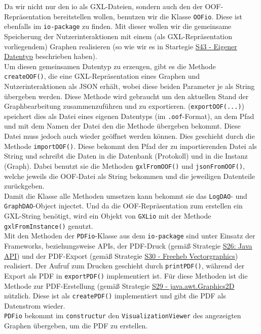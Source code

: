 \documentclass[enabledeprecatedfontcommands,fontsize=11pt,paper=a4,twoside]{scrartcl}
\newcounter{one}
\begin{document}
Da wir nicht nur den io als GXL-Dateien, sondern auch den der OOF-Repräsentation bereitstellen wollen, benutzen wir die Klasse \texttt{OOFio}.
Diese ist ebenfalls im \texttt{io-package} zu finden. Mit dieser wollen wir die gemeinsame Speicherung der Nutzerinteraktionen mit einem (als GXL-Repräsentation vorliegendem) Graphen realisieren (so wie wir es in Startegie \hyperlink{ooo}{S43 - Eigener Datentyp} beschrieben haben). \\
Um diesen gemeinsamen Datentyp zu erzeugen, gibt es die Methode \texttt{createOOF()}, die eine GXL-Repräsentation eines Graphen und Nutzerinteraktionen als JSON erhält, wobei diese beiden Parameter je als String übergeben werden. Diese Methode wird gebraucht um den aktuellen Stand der Graphbearbeitung zusammenzuführen und zu exportieren. (\texttt{exportOOF(...)}) speichert dies als Datei eines eigenen Datentyps (im \texttt{.oof}-Format), an dem Pfad und mit dem Namen der Datei den die Methode übergeben bekommt. Diese Datei muss jedoch auch wieder geöffnet werden können. Dies geschieht durch die Methode \texttt{importOOF()}. Diese bekommt den Pfad der zu importierenden Datei als String und schreibt die Daten in die Datenbank (Protokoll) und in die Instanz (Graph). Dabei benutzt sie die Methoden \texttt{gxlFromOOF()} und \texttt{jsonFromOOF()}, welche jeweils die OOF-Datei als String bekommen und die jeweiligen Datenteile zurückgeben. \\
Damit die Klasse alle Methoden umsetzen kann bekommt sie das \texttt{LogDAO}- und \texttt{GraphDAO}-Object injectet. Und da die OOF-Repräsentation zum erstellen ein GXL-String benötigt, wird ein Objekt von \texttt{GXLio} mit der Methode \texttt{gxlFromInstance()} genutzt.\\ 

Mit den Methoden der \texttt{PDFio}-Klasse aus dem \texttt{io-package} sind unter Einsatz der Frameworks, beziehungsweise APIs, der PDF-Druck (gemäß Strategie \hyperlink{ggg}{S26: Java API}) und der PDF-Export (gemäß Strategie \hyperlink{iii}{S30 - Freeheb Vectorgraphics}) realisiert. Der Aufruf zum Drucken geschieht durch \texttt{printPDF()}, während der Export als PDF in \texttt{exportPDF()} implementiert ist. Für diese Methoden ist die Methode zur PDF-Erstellung (gemäß Strategie \hyperlink{hhh}{S29 - java.awt.Graphics2D} nützlich. Diese ist als \texttt{createPDF()} implementiert und gibt die PDF als Datenstrom wieder. \\
\texttt{PDFio} bekommt im \texttt{constructur} den \texttt{VisualizationViewer} des angezeigten Graphen übergeben, um die PDF zu erstellen.
\end{document}
